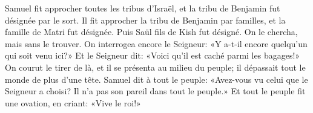 Samuel fit approcher toutes les tribus d’Israël,
	et la tribu de Benjamin fut désignée par le sort.
Il fit approcher la tribu de Benjamin par familles,
	et la famille de Matri fut désignée.
	Puis Saül fils de Kish fut désigné.
On le chercha, mais sans le trouver.
On interrogea encore le Seigneur:
	«Y a-t-il encore quelqu’un qui soit venu ici?»
Et le Seigneur dit: «Voici qu’il est caché parmi les bagages!»
On courut le tirer de là, et il se présenta au milieu du peuple;
	il dépassait tout le monde de plus d’une tête.
Samuel dit à tout le peuple:
	«Avez-vous vu celui que le Seigneur a choisi?
	Il n’a pas son pareil dans tout le peuple.»
Et tout le peuple fit une ovation, en criant: «Vive le roi!»
